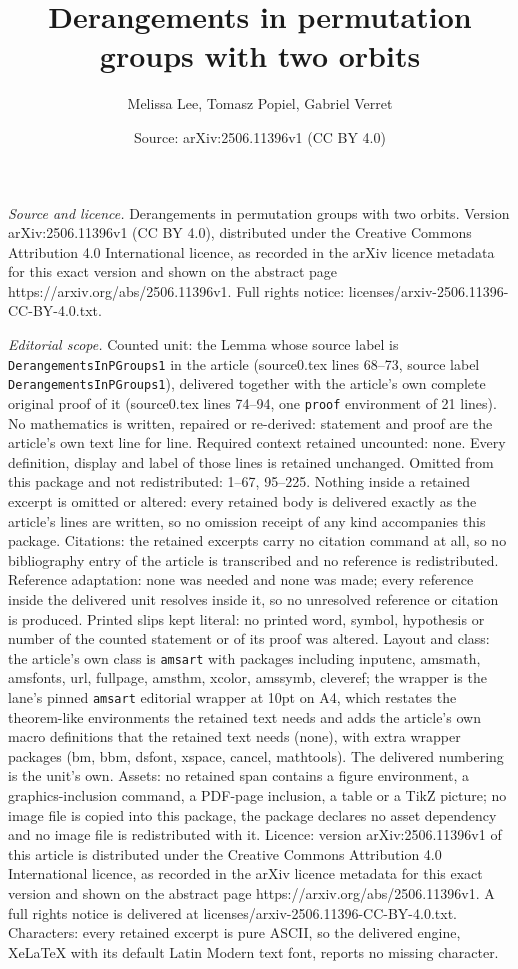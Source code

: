 \documentclass[10pt,a4paper]{amsart}
\title[Derangements in permutation groups with two orbits]{Derangements in permutation groups with two orbits}
\author{Melissa Lee, Tomasz Popiel, Gabriel Verret}
\date{Source: arXiv:2506.11396v1 (CC BY 4.0)}
\begin{document}
\maketitle

\noindent\emph{Source and licence.} Derangements in permutation groups with two orbits. Version arXiv:2506.11396v1 (CC BY 4.0), distributed under the Creative Commons Attribution 4.0 International licence, as recorded in the arXiv licence metadata for this exact version and shown on the abstract page https://arxiv.org/abs/2506.11396v1. Full rights notice: licenses/arxiv-2506.11396-CC-BY-4.0.txt.\par\smallskip

\noindent\textit{Editorial scope.} Counted unit: the Lemma whose source label is \texttt{DerangementsInPGroups1} in the article (source0.tex lines 68--73, source label \texttt{DerangementsInPGroups1}), delivered together with the article's own complete original proof of it (source0.tex lines 74--94, one \texttt{proof} environment of 21 lines). No mathematics is written, repaired or re-derived: statement and proof are the article's own text line for line. Required context retained uncounted: none. Every definition, display and label of those lines is retained unchanged. Omitted from this package and not redistributed: 1--67, 95--225. Nothing inside a retained excerpt is omitted or altered: every retained body is delivered exactly as the article's lines are written, so no omission receipt of any kind accompanies this package. Citations: the retained excerpts carry no citation command at all, so no bibliography entry of the article is transcribed and no reference is redistributed. Reference adaptation: none was needed and none was made; every reference inside the delivered unit resolves inside it, so no unresolved reference or citation is produced. Printed slips kept literal: no printed word, symbol, hypothesis or number of the counted statement or of its proof was altered. Layout and class: the article's own class is \texttt{amsart} with packages including inputenc, amsmath, amsfonts, url, fullpage, amsthm, xcolor, amssymb, cleveref; the wrapper is the lane's pinned \texttt{amsart} editorial wrapper at 10pt on A4, which restates the theorem-like environments the retained text needs and adds the article's own macro definitions that the retained text needs (none), with extra wrapper packages (bm, bbm, dsfont, xspace, cancel, mathtools). The delivered numbering is the unit's own. Assets: no retained span contains a figure environment, a graphics-inclusion command, a PDF-page inclusion, a table or a TikZ picture; no image file is copied into this package, the package declares no asset dependency and no image file is redistributed with it. Licence: version arXiv:2506.11396v1 of this article is distributed under the Creative Commons Attribution 4.0 International licence, as recorded in the arXiv licence metadata for this exact version and shown on the abstract page https://arxiv.org/abs/2506.11396v1. A full rights notice is delivered at licenses/arxiv-2506.11396-CC-BY-4.0.txt. Characters: every retained excerpt is pure ASCII, so the delivered engine, XeLaTeX with its default Latin Modern text font, reports no missing character.
\end{document}
